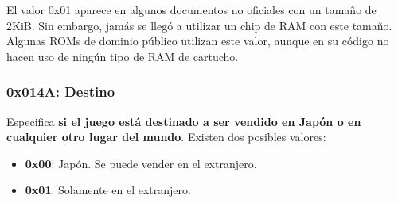 El valor 0x01 aparece en algunos documentos no oficiales con un tamaño de 2KiB. Sin embargo, jamás se llegó a utilizar un chip de RAM con este tamaño. Algunas ROMs de dominio público utilizan este valor, aunque en su código no hacen uso de ningún tipo de RAM de cartucho.

\subsubsection{0x014A: Destino}
Especifica \textbf{si el juego está destinado a ser vendido en Japón o en cualquier otro lugar del mundo}. Existen dos posibles valores:

\begin{itemize}
    \item \textbf{0x00}: Japón. Se puede vender en el extranjero.
    \item \textbf{0x01}: Solamente en el extranjero.
\end{itemize}

